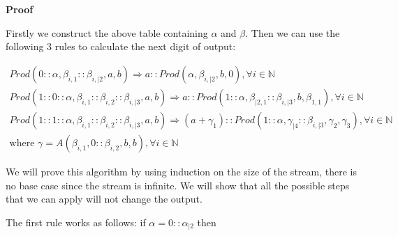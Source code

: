 \documentclass{cs4rep}
\begin{document}
{\bf Proof}

Firstly we construct the above table containing $\alpha$ and $\beta$.
Then we can use the following 3 rules to calculate the next digit of
output:

\[ \begin{array}{l}
Prod(0 :: \alpha, \beta_{i,1} :: \beta_{i,|2}, a, b) \Rightarrow a :: Prod(\alpha, \beta_{i,|2}, b, 0), \forall i \in \mathbb{N} \\
Prod(1 :: 0 :: \alpha, \beta_{i,1} :: \beta_{i,2} :: \beta_{i,|3}, a, b) \Rightarrow a :: Prod(1::\alpha, \beta_{|2,1} :: \beta_{i,|3}, b , \beta_{1,1}), \forall i \in \mathbb{N} \\
Prod( 1 :: 1 :: \alpha, \beta_{i,1} :: \beta_{i,2} :: \beta_{i,|3}, a, b) \Rightarrow ( a + \gamma_{1} )::Prod(1::\alpha, \gamma_{|4} :: \beta_{i,|3}, \gamma_{2} , \gamma_{3} ), \forall i \in \mathbb{N} \\
\mbox{where } \gamma = A(\beta_{i,1}, 0 :: \beta_{i,2}, b,b), \forall i \in \mathbb{N}
\end{array} \]

We will prove this algorithm by using induction on the size of the
stream, there is no base case since the stream is infinite. We will
show that all the possible steps that we can apply will not change the
output.

The first rule works as follows: if $ \alpha = 0 :: \alpha_{|2} $ then
\end{document}
